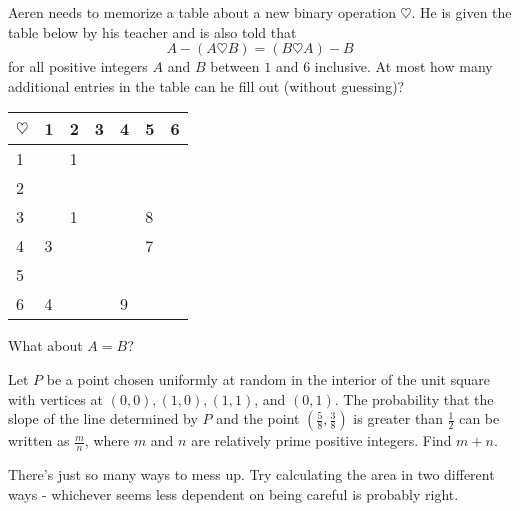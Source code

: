 \documentclass[mast]{lucky}
\begin{document}
\begin{prob}{3}
Aeren needs to memorize a table about a new binary operation $\heartsuit$. He is given the table below by his teacher and is also told that
\[A - (A \heartsuit B) = (B \heartsuit A) - B\]for all positive integers $A$ and $B$ between $1$ and $6$ inclusive. At most how many additional entries in the table can he fill out (without guessing)?
\begin{center}
\begin{tabular}{l|llllll} $\heartsuit$ & 1 & 2 & 3 & 4 & 5 & 6 \\ \hline 1 & & 1 & & & & \\ 2 & & & & & & \\ 3 & & 1 & & & 8 & \\ 4 & 3 & & & & 7 & \\ 5 & & & & & & \\ 6 & 4 & & & 9 & & \end{tabular}
\end{center}
\begin{mistakes}
    \begin{mistake}
        What about $A=B$?
    \end{mistake}
\end{mistakes}
\end{prob}

\begin{prob}[AIME II 2020/2]{3}
Let $P$ be a point chosen uniformly at random in the interior of the unit square with vertices at $(0,0), (1,0), (1,1)$, and $(0,1)$. The probability that the slope of the line determined by $P$ and the point $\left(\frac58, \frac38 \right)$ is greater than $\frac12$ can be written as $\frac{m}{n}$, where $m$ and $n$ are relatively prime positive integers. Find $m+n$.
\begin{mistakes}
    \begin{mistake}
        There's just so many ways to mess up. Try calculating the area in two different ways - whichever seems less dependent on being careful is probably right.
    \end{mistake}
\end{mistakes}
\end{prob}
\end{document}
